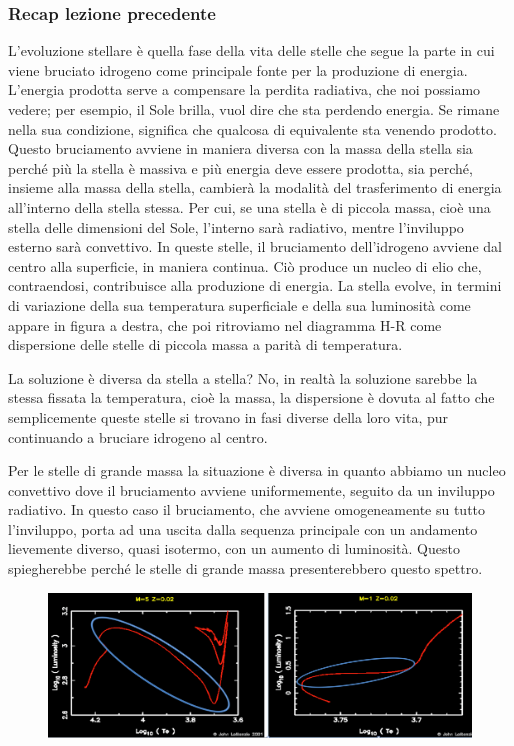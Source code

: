 \subsubsection{Recap lezione precedente}
L'evoluzione stellare è quella fase della vita delle stelle che segue la parte in cui viene bruciato idrogeno come principale fonte per la produzione di energia. L'energia prodotta serve a compensare la perdita radiativa, che noi possiamo vedere; per esempio, il Sole brilla, vuol dire che sta perdendo energia. Se rimane nella sua condizione, significa che qualcosa di equivalente sta venendo prodotto. Questo bruciamento avviene in maniera diversa con la massa della stella sia perché più la stella è massiva e più energia deve essere prodotta, sia perché, insieme alla massa della stella, cambierà la modalità del trasferimento di energia all'interno della stella stessa. Per cui, se una stella è di piccola massa, cioè una stella delle dimensioni del Sole, l'interno sarà radiativo, mentre l'inviluppo esterno sarà convettivo. In queste stelle, il bruciamento dell'idrogeno avviene dal centro alla superficie, in maniera continua. Ciò produce un nucleo di elio che, contraendosi, contribuisce alla produzione di energia. La stella evolve, in termini di variazione della sua temperatura superficiale e della sua luminosità come appare in figura a destra, che poi ritroviamo nel diagramma H-R come dispersione delle stelle di piccola massa a parità di temperatura.

La soluzione è diversa da stella a stella? No, in realtà la soluzione sarebbe la stessa fissata la temperatura, cioè la massa, la dispersione è dovuta al fatto che semplicemente queste stelle si trovano in fasi diverse della loro vita, pur continuando a bruciare idrogeno al centro.

Per le stelle di grande massa la situazione è diversa in quanto abbiamo un nucleo convettivo dove il bruciamento avviene uniformemente, seguito da un inviluppo radiativo. In questo caso il bruciamento, che avviene omogeneamente su tutto l'inviluppo, porta ad una uscita dalla sequenza principale con un andamento lievemente diverso, quasi isotermo, con un aumento di luminosità. Questo spiegherebbe perché le stelle di grande massa presenterebbero questo spettro.

\begin{figure}[H]
        \centering
        \includegraphics[width=12cm]{lezione 28 novembre/luminositatemperaturagrafico.png}
    \label{lezione 28 novembre/luminositatemperaturagrafico.png}
\end{figure}

